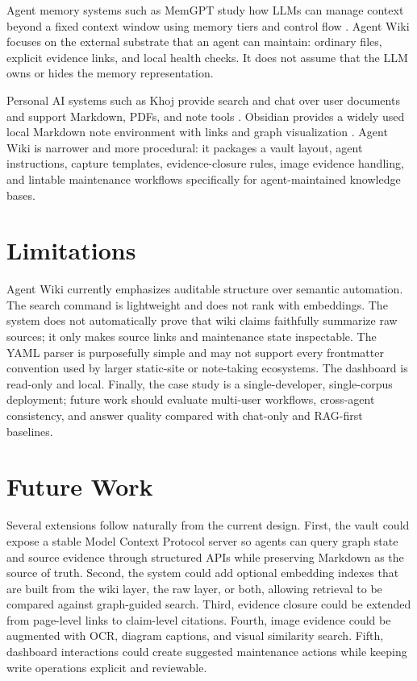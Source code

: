 \documentclass[10pt]{article}
\begin{document}
Agent memory systems such as MemGPT study how LLMs can manage context beyond a
fixed context window using memory tiers and control flow \cite{packer2023memgpt}.
Agent Wiki focuses on the external substrate that an agent can maintain: ordinary
files, explicit evidence links, and local health checks. It does not assume that
the LLM owns or hides the memory representation.

Personal AI systems such as Khoj provide search and chat over user documents and
support Markdown, PDFs, and note tools \cite{khojDocs}. Obsidian provides a
widely used local Markdown note environment with links and graph visualization
\cite{obsidian}. Agent Wiki is narrower and more procedural: it packages a vault
layout, agent instructions, capture templates, evidence-closure rules, image
evidence handling, and lintable maintenance workflows specifically for
agent-maintained knowledge bases.

\section{Limitations}

Agent Wiki currently emphasizes auditable structure over semantic automation.
The search command is lightweight and does not rank with embeddings. The system
does not automatically prove that wiki claims faithfully summarize raw sources;
it only makes source links and maintenance state inspectable. The YAML parser is
purposefully simple and may not support every frontmatter convention used by
larger static-site or note-taking ecosystems. The dashboard is read-only and
local. Finally, the case study is a single-developer, single-corpus deployment;
future work should evaluate multi-user workflows, cross-agent consistency, and
answer quality compared with chat-only and RAG-first baselines.

\section{Future Work}

Several extensions follow naturally from the current design. First, the vault
could expose a stable Model Context Protocol server so agents can query graph
state and source evidence through structured APIs while preserving Markdown as
the source of truth. Second, the system could add optional embedding indexes that
are built from the wiki layer, the raw layer, or both, allowing retrieval to be
compared against graph-guided search. Third, evidence closure could be extended
from page-level links to claim-level citations. Fourth, image evidence could be
augmented with OCR, diagram captions, and visual similarity search. Fifth,
dashboard interactions could create suggested maintenance actions while keeping
write operations explicit and reviewable.
\end{document}
